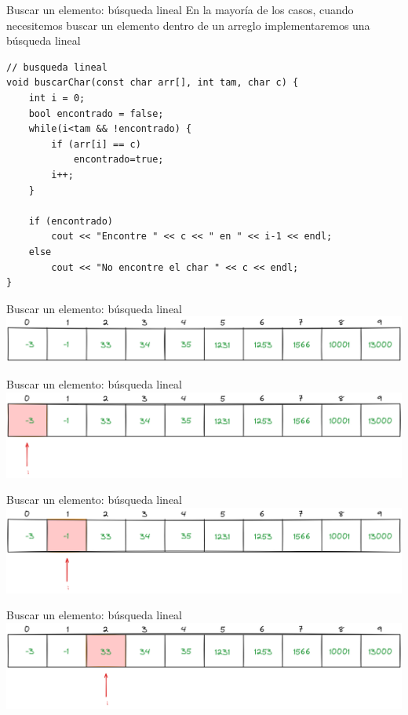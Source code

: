 \documentclass[12pt]{beamer}
\begin{document}
\begin{frame}[fragile]{Buscar un elemento: búsqueda lineal}
    En la mayoría de los casos, cuando necesitemos buscar un elemento dentro de un arreglo implementaremos una \alert{búsqueda lineal}
\begin{lstlisting}[basicstyle=\scriptsize]
// busqueda lineal
void buscarChar(const char arr[], int tam, char c) {
    int i = 0;
    bool encontrado = false;
    while(i<tam && !encontrado) {
        if (arr[i] == c)
            encontrado=true;
        i++;
    }

    if (encontrado)
        cout << "Encontre " << c << " en " << i-1 << endl;
    else
        cout << "No encontre el char " << c << endl;
}
\end{lstlisting}
\end{frame}

\begin{frame}{Buscar un elemento: búsqueda lineal}
    \includegraphics[width=\textwidth]{arreglo_inicial_busqueda.png}
\end{frame}

\begin{frame}{Buscar un elemento: búsqueda lineal}
    \includegraphics[width=\textwidth]{busqueda_lineal_1.png}
\end{frame}

\begin{frame}{Buscar un elemento: búsqueda lineal}
    \includegraphics[width=\textwidth]{busqueda_lineal_2.png}
\end{frame}

\begin{frame}{Buscar un elemento: búsqueda lineal}
    \includegraphics[width=\textwidth]{busqueda_lineal_3.png}
\end{frame}
\end{document}
